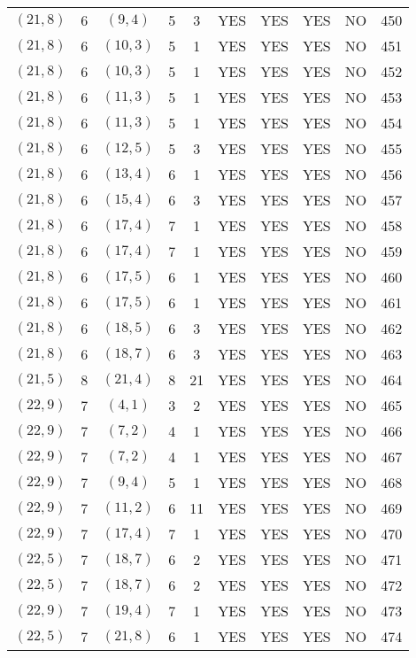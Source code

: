 \begin{longtable}{|c|c|c|c|c|c|c|c|c|c|}
$(21, 8)$ & 6 & $(9, 4)$ & 5 & 3 & YES & YES & YES & NO & 450\\
$(21, 8)$ & 6 & $(10, 3)$ & 5 & 1 & YES & YES & YES & NO & 451\\
$(21, 8)$ & 6 & $(10, 3)$ & 5 & 1 & YES & YES & YES & NO & 452\\
$(21, 8)$ & 6 & $(11, 3)$ & 5 & 1 & YES & YES & YES & NO & 453\\
$(21, 8)$ & 6 & $(11, 3)$ & 5 & 1 & YES & YES & YES & NO & 454\\
$(21, 8)$ & 6 & $(12, 5)$ & 5 & 3 & YES & YES & YES & NO & 455\\
$(21, 8)$ & 6 & $(13, 4)$ & 6 & 1 & YES & YES & YES & NO & 456\\
$(21, 8)$ & 6 & $(15, 4)$ & 6 & 3 & YES & YES & YES & NO & 457\\
$(21, 8)$ & 6 & $(17, 4)$ & 7 & 1 & YES & YES & YES & NO & 458\\
$(21, 8)$ & 6 & $(17, 4)$ & 7 & 1 & YES & YES & YES & NO & 459\\
$(21, 8)$ & 6 & $(17, 5)$ & 6 & 1 & YES & YES & YES & NO & 460\\
$(21, 8)$ & 6 & $(17, 5)$ & 6 & 1 & YES & YES & YES & NO & 461\\
$(21, 8)$ & 6 & $(18, 5)$ & 6 & 3 & YES & YES & YES & NO & 462\\
$(21, 8)$ & 6 & $(18, 7)$ & 6 & 3 & YES & YES & YES & NO & 463\\
$(21, 5)$ & 8 & $(21, 4)$ & 8 & 21 & YES & YES & YES & NO & 464\\
$(22, 9)$ & 7 & $(4, 1)$ & 3 & 2 & YES & YES & YES & NO & 465\\
$(22, 9)$ & 7 & $(7, 2)$ & 4 & 1 & YES & YES & YES & NO & 466\\
$(22, 9)$ & 7 & $(7, 2)$ & 4 & 1 & YES & YES & YES & NO & 467\\
$(22, 9)$ & 7 & $(9, 4)$ & 5 & 1 & YES & YES & YES & NO & 468\\
$(22, 9)$ & 7 & $(11, 2)$ & 6 & 11 & YES & YES & YES & NO & 469\\
$(22, 9)$ & 7 & $(17, 4)$ & 7 & 1 & YES & YES & YES & NO & 470\\
$(22, 5)$ & 7 & $(18, 7)$ & 6 & 2 & YES & YES & YES & NO & 471\\
$(22, 5)$ & 7 & $(18, 7)$ & 6 & 2 & YES & YES & YES & NO & 472\\
$(22, 9)$ & 7 & $(19, 4)$ & 7 & 1 & YES & YES & YES & NO & 473\\
$(22, 5)$ & 7 & $(21, 8)$ & 6 & 1 & YES & YES & YES & NO & 474\\

\end{longtable}
